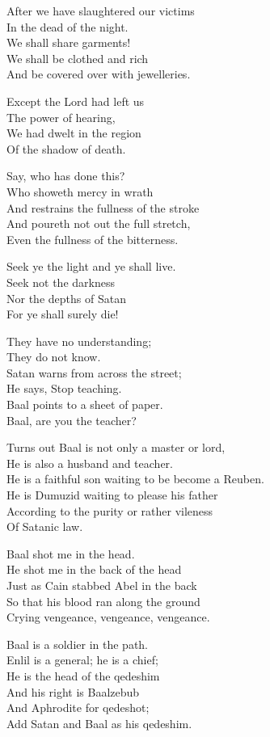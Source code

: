 \documentclass[
]{book}
\begin{document}
After we have slaughtered our victims\\
In the dead of the night.\\
We shall share garments!\\
We shall be clothed and rich\\
And be covered over with jewelleries.

Except the Lord had left us\\
The power of hearing,\\
We had dwelt in the region\\
Of the shadow of death.

Say, who has done this?\\
Who showeth mercy in wrath\\
And restrains the fullness of the stroke\\
And poureth not out the full stretch,\\
Even the fullness of the bitterness.

Seek ye the light and ye shall live.\\
Seek not the darkness\\
Nor the depths of Satan\\
For ye shall surely die!

They have no understanding;\\
They do not know.\\
Satan warns from across the street;\\
He says, Stop teaching.\\
Baal points to a sheet of paper.\\
Baal, are you the teacher?

Turns out Baal is not only a master or lord,\\
He is also a husband and teacher.\\
He is a faithful son waiting to be become a Reuben.\\
He is Dumuzid waiting to please his father\\
According to the purity or rather vileness\\
Of Satanic law.

Baal shot me in the head.\\
He shot me in the back of the head\\
Just as Cain stabbed Abel in the back\\
So that his blood ran along the ground\\
Crying vengeance, vengeance, vengeance.

Baal is a soldier in the path.\\
Enlil is a general; he is a chief;\\
He is the head of the qedeshim\\
And his right is Baalzebub\\
And Aphrodite for qedeshot;\\
Add Satan and Baal as his qedeshim.
\end{document}
